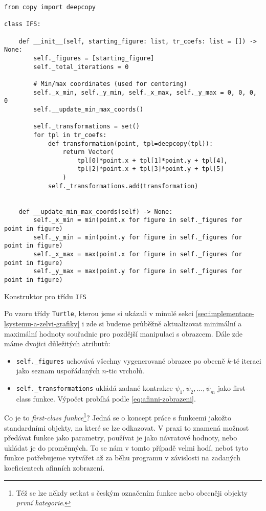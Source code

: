 \begin{program}[h]
\begin{lstlisting}[style=python]
from copy import deepcopy

class IFS:

    def __init__(self, starting_figure: list, tr_coefs: list = []) -> None:
        self._figures = [starting_figure]
        self._total_iterations = 0

        # Min/max coordinates (used for centering)
        self._x_min, self._y_min, self._x_max, self._y_max = 0, 0, 0, 0
        self.__update_min_max_coords()

        self._transformations = set()
        for tpl in tr_coefs:
            def transformation(point, tpl=deepcopy(tpl)):
                return Vector(
                    tpl[0]*point.x + tpl[1]*point.y + tpl[4],
                    tpl[2]*point.x + tpl[3]*point.y + tpl[5]
                )
            self._transformations.add(transformation)
    
    
    def __update_min_max_coords(self) -> None:
        self._x_min = min(point.x for figure in self._figures for point in figure)
        self._y_min = min(point.y for figure in self._figures for point in figure)
        self._x_max = max(point.x for figure in self._figures for point in figure)
        self._y_max = max(point.y for figure in self._figures for point in figure)
\end{lstlisting}
    \caption{Konstruktor pro třídu \texttt{IFS}}
    \label{prog:konstruktor-ifs}
\end{program}
Po vzoru třídy \texttt{Turtle}, kterou jsme si ukázali v minulé sekci \ref{sec:implementace-lsystemu-a-zelvi-grafiky} i zde si budeme průběžně aktualizovat minimální a maximální hodnoty souřadnic pro pozdější manipulaci s obrazcem. Dále zde máme dvojici důležitých atributů:
\begin{itemize}
    \item \texttt{self.\_figures} uchovává všechny vygenerované obrazce po obecně $k$-té iteraci jako seznam uspořádaných $n$-tic vrcholů.
    \item \texttt{self.\_transformations} ukládá zadané kontrakce $\psi_1,\psi_2,\ldots,\psi_m$ jako first-class funkce. Výpočet probíhá podle \eqref{eq:afinni-zobrazeni}.
\end{itemize}
Co je to \emph{first-class funkce}\footnote{Též se lze někdy setkat s českým označením funkce nebo obecněji objekty \emph{první kategorie}.}? Jedná se o koncept práce s funkcemi jakožto standardními objekty, na které se lze odkazovat. V praxi to znamená možnost předávat funkce jako parametry, používat je jako návratové hodnoty, nebo ukládat je do proměnných. To se nám v tomto případě velmi hodí, neboť tyto funkce potřebujeme vytvářet až za běhu programu v závislosti na zadaných koeficientech afinních zobrazení.

